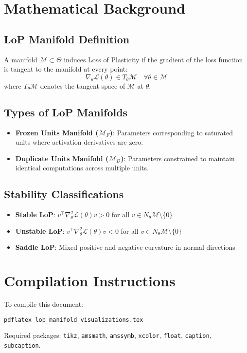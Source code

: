 \documentclass[11pt,a4paper]{article}
\begin{document}
\section{Mathematical Background}

\subsection{LoP Manifold Definition}
A manifold $\mathcal{M} \subset \Theta$ induces Loss of Plasticity if the gradient of the loss function is tangent to the manifold at every point:
$$\nabla_\theta \mathcal{L}(\theta) \in T_\theta\mathcal{M} \quad \forall \theta \in \mathcal{M}$$
where $T_\theta\mathcal{M}$ denotes the tangent space of $\mathcal{M}$ at $\theta$.

\subsection{Types of LoP Manifolds}
\begin{itemize}
    \item \textbf{Frozen Units Manifold ($\mathcal{M}_F$)}: Parameters corresponding to saturated units where activation derivatives are zero.
    \item \textbf{Duplicate Units Manifold ($\mathcal{M}_D$)}: Parameters constrained to maintain identical computations across multiple units.
\end{itemize}

\subsection{Stability Classifications}
\begin{itemize}
    \item \textbf{Stable LoP}: $v^\top\nabla_\theta^2\mathcal{L}(\theta)v > 0$ for all $v \in N_\theta\mathcal{M}\setminus\{0\}$
    \item \textbf{Unstable LoP}: $v^\top\nabla_\theta^2\mathcal{L}(\theta)v < 0$ for all $v \in N_\theta\mathcal{M}\setminus\{0\}$
    \item \textbf{Saddle LoP}: Mixed positive and negative curvature in normal directions
\end{itemize}

\section{Compilation Instructions}
To compile this document:
\begin{verbatim}
pdflatex lop_manifold_visualizations.tex
\end{verbatim}

Required packages: \texttt{tikz}, \texttt{amsmath}, \texttt{amssymb}, \texttt{xcolor}, \texttt{float}, \texttt{caption}, \texttt{subcaption}.
\end{document}
